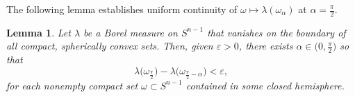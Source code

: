 \documentclass{cpamart1}     %
\newtheorem{lemm}[theo]{Lemma}
\theoremstyle{definition}
\theoremstyle{remark}
\newcommand{\sn}{S^{n-1}}
\begin{document}
The following lemma establishes uniform continuity of $\omega\mapsto\lambda(\omega_\alpha)$
at $\alpha=\frac\pi2$.



\begin{lemm}\label{s1}
Let $\lambda$ be a Borel measure on $\sn$ that vanishes on the boundary
of all compact, spherically convex sets. Then, given
$\varepsilon>0$, there exists $\alpha \in \big(0, \frac\pi2\big)$
so that
\begin{equation}\label{s1.1}
\lambda\big(\omega_\frac\pi2\big) - \lambda\big(\omega_{\frac\pi2-\alpha}\big)
<\varepsilon,
\end{equation}
for each nonempty compact set $\omega\subset\sn$ contained in some closed hemisphere.
\end{lemm}
\end{document}
